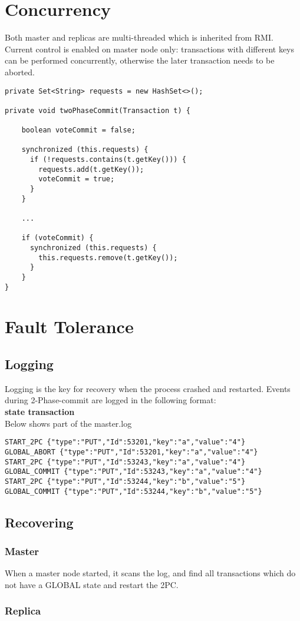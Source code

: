 \documentclass[11pt, oneside]{article}   	%
\begin{document}
\section{Concurrency}
\label{sec:concurrency}
Both master and replicas are multi-threaded which is inherited from RMI. \\
Current control is enabled on master node only: transactions with different keys can be performed concurrently, otherwise the later transaction needs to be aborted.
\begin{verbatim}               
private Set<String> requests = new HashSet<>();

private void twoPhaseCommit(Transaction t) {

    boolean voteCommit = false;

    synchronized (this.requests) {
      if (!requests.contains(t.getKey())) {
        requests.add(t.getKey());
        voteCommit = true;
      }
    }
    
    ...
    
    if (voteCommit) {
      synchronized (this.requests) {
        this.requests.remove(t.getKey());
      }
    }
}
\end{verbatim}

\section{Fault Tolerance}
\subsection{Logging}
Logging is the key for recovery when the process crashed and restarted.
Events during 2-Phase-commit are logged in the following format: \\
{\bf state transaction} \\
Below shows part of the master.log
\begin{verbatim}
START_2PC {"type":"PUT","Id":53201,"key":"a","value":"4"}
GLOBAL_ABORT {"type":"PUT","Id":53201,"key":"a","value":"4"}
START_2PC {"type":"PUT","Id":53243,"key":"a","value":"4"}
GLOBAL_COMMIT {"type":"PUT","Id":53243,"key":"a","value":"4"}
START_2PC {"type":"PUT","Id":53244,"key":"b","value":"5"}
GLOBAL_COMMIT {"type":"PUT","Id":53244,"key":"b","value":"5"}
\end{verbatim}
\subsection{Recovering}
\subsubsection{Master}
When a master node started, it scans the log, and find all transactions which do not have a GLOBAL state and restart the 2PC.
\subsubsection{Replica}
\end{document}
